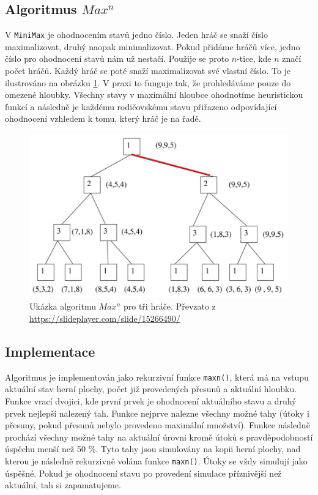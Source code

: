 \documentclass[a4paper,11pt]{article}
\begin{document}
	\subsection{Algoritmus \texttt{$Max^n$}}
		V \texttt{MiniMax} je ohodnocením stavů jedno číslo. Jeden hráč se snaží číslo maximalizovat, druhý naopak minimalizovat. Pokud přidáme hráčů více, jedno číslo pro ohodnocení stavů nám už nestačí. Použije se proto $n$-tice, kde $n$ značí počet hráčů. Každý hráč se poté snaží maximalizovat své vlastní číslo. To je ilustrováno na obrázku \ref{fig:maxn}. V praxi to funguje tak, že prohledáváme pouze do omezené hloubky. Všechny stavy v maximální hloubce ohodnotíme heuristickou funkcí a následně je každému rodičovskému stavu přiřazeno odpovídající ohodnocení vzhledem k tomu, který hráč je na řadě.
		
		\begin{figure}[h]
			\centering
			\includegraphics[scale=0.5]{maxn.png}
			\caption{Ukázka algoritmu \texttt{$Max^n$} pro tři hráče. Převzato z \url{https://slideplayer.com/slide/15266490/}}
			\label{fig:maxn}
		\end{figure}
		
	\subsection{Implementace}
		Algoritmus je implementován jako rekurzivní funkce \texttt{maxn()}, která má na vstupu aktuální stav herní plochy, počet již provedených přesunů a aktuální hloubku. Funkce vrací dvojici, kde první prvek je ohodnocení aktuálního stavu a druhý prvek nejlepší nalezený tah. Funkce nejprve nalezne všechny možné tahy (útoky i přesuny, pokud přesunů nebylo provedeno maximální množství). Funkce následně prochází všechny možné tahy na aktuální úrovni kromě útoků s pravděpodobností úspěchu menší než 50 \%. Tyto tahy jsou simulovány na kopii herní plochy, nad kterou je následně rekurzivně volána funkce \texttt{maxn()}. Útoky se vždy simulují jako úspěšné.
		Pokud je ohodnocení stavu po provedení simulace příznivější než aktuální, tah si zapamatujeme.
		
\end{document}
